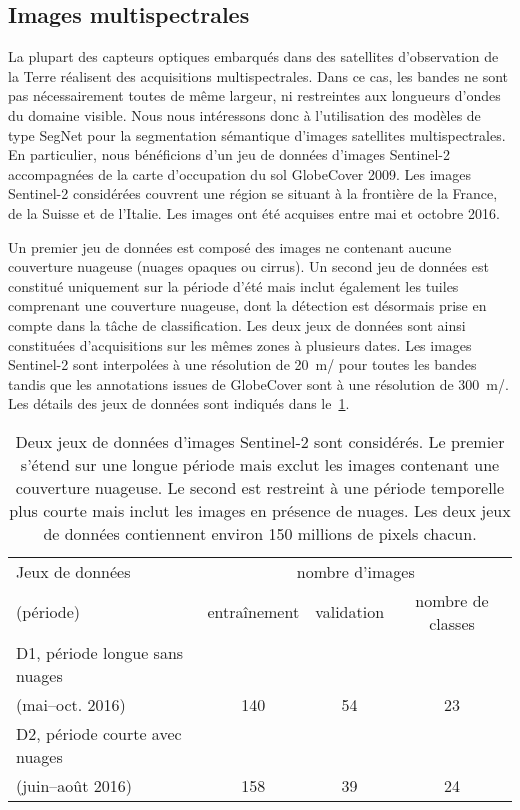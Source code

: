 
\subsection{Images multispectrales}

La plupart des capteurs optiques embarqués dans des satellites d'observation de la Terre réalisent des acquisitions multispectrales. Dans ce cas, les bandes ne sont pas nécessairement toutes de même largeur, ni restreintes aux longueurs d'ondes du domaine visible. Nous nous intéressons donc à l'utilisation des modèles de type SegNet pour la segmentation sémantique d'images satellites multispectrales.
En particulier, nous bénéficions d'un jeu de données d'images Sentinel-2 accompagnées de la carte d'occupation du sol GlobeCover 2009. Les images Sentinel-2 considérées couvrent une région se situant à la frontière de la France, de la Suisse et de l'Italie. Les images ont été acquises entre mai et octobre 2016.

Un premier jeu de données est composé des images ne contenant aucune couverture nuageuse (nuages opaques ou cirrus). Un second jeu de données est constitué uniquement sur la période d'été mais inclut également les tuiles comprenant une couverture nuageuse, dont la détection est désormais prise en compte dans la tâche de classification. Les deux jeux de données sont ainsi constituées d'acquisitions sur les mêmes zones à plusieurs dates. Les images Sentinel-2 sont interpolées à une résolution de \SI{20}{\meter/\px} pour toutes les bandes tandis que les annotations issues de GlobeCover sont à une résolution de \SI{300}{\meter/\px}. Les détails des jeux de données sont indiqués dans le~\cref{tab:datasets}.

\begin{table}
\caption{Deux jeux de données d'images Sentinel-2 sont considérés. Le premier s'étend sur une longue période mais exclut les images contenant une couverture nuageuse. Le second est restreint à une période temporelle plus courte mais inclut les images en présence de nuages. Les deux jeux de données contiennent environ 150 millions de pixels chacun.}
\label{tab:datasets}
\begin{tabular}{lccc}
\toprule
Jeux de données & \multicolumn{3}{c}{nombre d'images}\\
(période)  & entraînement & validation  & nombre de classes \\
\midrule
D1, période longue sans nuages & & & \\
 (mai--oct. 2016) & 140 & 54 & 23 \\
\midrule
D2, période courte avec nuages & & & \\
(juin--août 2016) & 158 & 39 & 24 \\
\bottomrule
\end{tabular}
\end{table}

